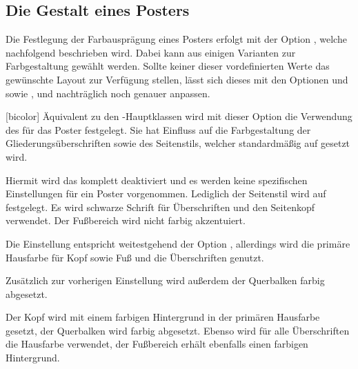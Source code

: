 \begin{DeclareEntity}{}
\subsection{Die Gestalt eines Posters}
%
Die Festlegung der Farbausprägung eines Posters erfolgt mit der Option 
, welche nachfolgend beschrieben wird. Dabei kann aus einigen 
Varianten zur Farbgestaltung gewählt werden. Sollte keiner dieser 
vordefinierten Werte das gewünschte Layout zur Verfügung stellen, lässt sich 
dieses mit den Optionen  und  sowie 
,  und  nachträglich 
noch genauer anpassen.


\begin{Declaration}
  {}
  [bicolor]
\printdeclarationlist
%
Äquivalent zu den \TUDScript-Hauptklassen wird mit dieser Option die Verwendung 
des \TUDCDs für das Poster festgelegt. Sie hat Einfluss auf die Farbgestaltung 
der Gliederungsüberschriften sowie des Seitenstils, welcher standardmäßig auf 
 gesetzt wird.
%
\begin{values}{}
\itemfalse
  Hiermit wird das \CD komplett deaktiviert und es werden keine spezifischen 
  Einstellungen für ein Poster vorgenommen. Lediglich der Seitenstil wird auf 
   festgelegt.
  Es wird schwarze Schrift für Überschriften und den Seitenkopf verwendet. Der 
  Fußbereich wird nicht farbig akzentuiert.
\item[lightcolor/pale]
  Die Einstellung entspricht weitestgehend der Option , 
  allerdings wird die primäre Hausfarbe  für Kopf sowie Fuß und 
  die Überschriften genutzt.
\item[barcolor]
  Zusätzlich zur vorherigen Einstellung wird außerdem der Querbalken farbig 
  abgesetzt.
\item[bicolor/color/fullcolor]
  Der Kopf wird mit einem farbigen Hintergrund in der primären Hausfarbe 
   gesetzt, der Querbalken wird farbig abgesetzt. Ebenso wird für 
  alle Überschriften die Hausfarbe verwendet, der Fußbereich erhält ebenfalls 
  einen farbigen Hintergrund.
\end{values}
\end{Declaration}


\end{DeclareEntity}
